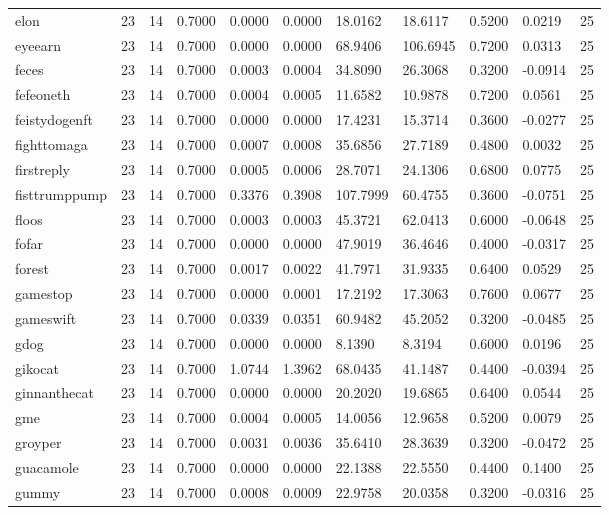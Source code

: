 \begin{table}[htbp]
\begin{tabular}{lllllllllll}
elon & 23 & 14 & 0.7000 & 0.0000 & 0.0000 & 18.0162 & 18.6117 & 0.5200 & 0.0219 & 25 \\
eyeearn & 23 & 14 & 0.7000 & 0.0000 & 0.0000 & 68.9406 & 106.6945 & 0.7200 & 0.0313 & 25 \\
feces & 23 & 14 & 0.7000 & 0.0003 & 0.0004 & 34.8090 & 26.3068 & 0.3200 & -0.0914 & 25 \\
fefeoneth & 23 & 14 & 0.7000 & 0.0004 & 0.0005 & 11.6582 & 10.9878 & 0.7200 & 0.0561 & 25 \\
feistydogenft & 23 & 14 & 0.7000 & 0.0000 & 0.0000 & 17.4231 & 15.3714 & 0.3600 & -0.0277 & 25 \\
fighttomaga & 23 & 14 & 0.7000 & 0.0007 & 0.0008 & 35.6856 & 27.7189 & 0.4800 & 0.0032 & 25 \\
firstreply & 23 & 14 & 0.7000 & 0.0005 & 0.0006 & 28.7071 & 24.1306 & 0.6800 & 0.0775 & 25 \\
fisttrumppump & 23 & 14 & 0.7000 & 0.3376 & 0.3908 & 107.7999 & 60.4755 & 0.3600 & -0.0751 & 25 \\
floos & 23 & 14 & 0.7000 & 0.0003 & 0.0003 & 45.3721 & 62.0413 & 0.6000 & -0.0648 & 25 \\
fofar & 23 & 14 & 0.7000 & 0.0000 & 0.0000 & 47.9019 & 36.4646 & 0.4000 & -0.0317 & 25 \\
forest & 23 & 14 & 0.7000 & 0.0017 & 0.0022 & 41.7971 & 31.9335 & 0.6400 & 0.0529 & 25 \\
gamestop & 23 & 14 & 0.7000 & 0.0000 & 0.0001 & 17.2192 & 17.3063 & 0.7600 & 0.0677 & 25 \\
gameswift & 23 & 14 & 0.7000 & 0.0339 & 0.0351 & 60.9482 & 45.2052 & 0.3200 & -0.0485 & 25 \\
gdog & 23 & 14 & 0.7000 & 0.0000 & 0.0000 & 8.1390 & 8.3194 & 0.6000 & 0.0196 & 25 \\
gikocat & 23 & 14 & 0.7000 & 1.0744 & 1.3962 & 68.0435 & 41.1487 & 0.4400 & -0.0394 & 25 \\
ginnanthecat & 23 & 14 & 0.7000 & 0.0000 & 0.0000 & 20.2020 & 19.6865 & 0.6400 & 0.0544 & 25 \\
gme & 23 & 14 & 0.7000 & 0.0004 & 0.0005 & 14.0056 & 12.9658 & 0.5200 & 0.0079 & 25 \\
groyper & 23 & 14 & 0.7000 & 0.0031 & 0.0036 & 35.6410 & 28.3639 & 0.3200 & -0.0472 & 25 \\
guacamole & 23 & 14 & 0.7000 & 0.0000 & 0.0000 & 22.1388 & 22.5550 & 0.4400 & 0.1400 & 25 \\
gummy & 23 & 14 & 0.7000 & 0.0008 & 0.0009 & 22.9758 & 20.0358 & 0.3200 & -0.0316 & 25 \\

\end{tabular}
\end{table}

